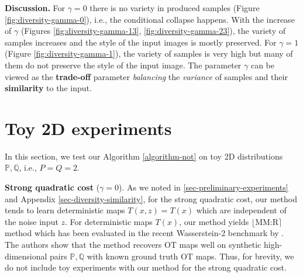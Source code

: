 \documentclass{article} %
\begin{document}
\textbf{Discussion.} For $\gamma=0$ there is no variety in produced samples (Figure \ref{fig:diversity-gamma-0}), i.e., the conditional collapse happens. With the increase of $\gamma$ (Figures \ref{fig:diversity-gamma-13}, \ref{fig:diversity-gamma-23}), the variety of samples increases and the style of the input images is mostly preserved. For $\gamma=1$ (Figure \ref{fig:diversity-gamma-1}), the variety of samples is very high but many of them do not preserve the style of the input image. The parameter $\gamma$ can be viewed as the \textbf{trade-off} parameter \textit{balancing} the \textit{variance} of samples and their \textbf{similarity} to the input.

\section{Toy 2D experiments}
\label{sec-toy-experiments}

In this section, we test our Algorithm \ref{algorithm-not} on toy 2D distributions $\mathbb{P},\mathbb{Q}$, i.e., $P=Q=2$. 

\textbf{Strong quadratic cost} ($\gamma=0$). As we noted in \wasyparagraph\ref{sec-preliminary-experiments} and Appendix \ref{sec-diversity-similarity}, for the strong quadratic cost, our method tends to learn deterministic maps $T(x,z)=T(x)$ which are independent of the noise input $z$. For deterministic maps $T(x)$, our method yields  $\lfloor \text{MM:R}\rceil$ method which has been evaluated in the recent Wasserstein-2 benchmark by \citep{korotin2021neural}. The authors show that the method recovers OT maps well on synthetic high-dimensional pairs $\mathbb{P},\mathbb{Q}$ with known ground truth OT maps. Thus, for brevity, we do not include toy experiments with our method for the strong quadratic cost.
\end{document}
